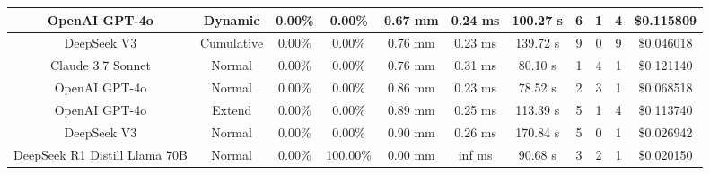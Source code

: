 \begin{table}[H]
\begin{center}
\begin{tabular}{|c|c|c|c|c|c|c|c|c|c|c|}
    \hline
    OpenAI GPT-4o & Dynamic & 0.00\% & 0.00\% & 0.67 mm & 0.24 ms & 100.27 s & 6 & 1 & 4 & \$0.115809 \\
    \hline
    DeepSeek V3 & Cumulative & 0.00\% & 0.00\% & 0.76 mm & 0.23 ms & 139.72 s & 9 & 0 & 9 & \$0.046018 \\
    \hline
    Claude 3.7 Sonnet & Normal & 0.00\% & 0.00\% & 0.76 mm & 0.31 ms & 80.10 s & 1 & 4 & 1 & \$0.121140 \\
    \hline
    OpenAI GPT-4o & Normal & 0.00\% & 0.00\% & 0.86 mm & 0.23 ms & 78.52 s & 2 & 3 & 1 & \$0.068518 \\
    \hline
    OpenAI GPT-4o & Extend & 0.00\% & 0.00\% & 0.89 mm & 0.25 ms & 113.39 s & 5 & 1 & 4 & \$0.113740 \\
    \hline
    DeepSeek V3 & Normal & 0.00\% & 0.00\% & 0.90 mm & 0.26 ms & 170.84 s & 5 & 0 & 1 & \$0.026942 \\
    \hline
    DeepSeek R1 Distill Llama 70B & Normal & 0.00\% & 100.00\% & 0.00 mm & inf ms & 90.68 s & 3 & 2 & 1 & \$0.020150 \\
    \hline
\end{tabular}
\label{Results-Position-1-3}
\end{center}
\end{table}

